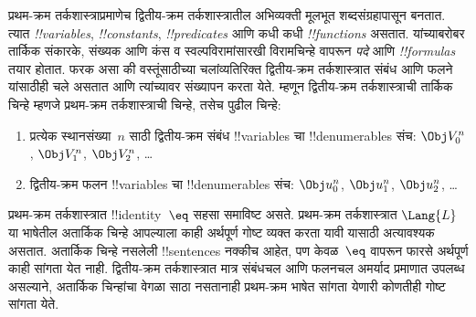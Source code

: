 \documentclass[../../../include/open-logic-section]{subfiles}
\begin{document}


प्रथम-क्रम तर्कशास्त्राप्रमाणेच द्वितीय-क्रम तर्कशास्त्रातील
अभिव्यक्ती मूलभूत शब्दसंग्रहापासून बनतात. त्यात \emph{!!{variable}s},
\emph{!!{constant}s}, \emph{!!{predicate}s} आणि कधी कधी
\emph{!!{function}s} असतात. यांच्याबरोबर तार्किक संकारके,
संख्यक आणि कंस व स्वल्पविरामांसारखी विरामचिन्हे वापरून
\emph{पदे} आणि \emph{!!{formula}s} तयार होतात. फरक असा की
वस्तूंसाठीच्या चलांव्यतिरिक्त द्वितीय-क्रम तर्कशास्त्रात संबंध
आणि फलने यांसाठीही चले असतात आणि त्यांच्यावर संख्यापन
करता येते. म्हणून द्वितीय-क्रम तर्कशास्त्राची तार्किक चिन्हे
म्हणजे प्रथम-क्रम तर्कशास्त्राची चिन्हे, तसेच पुढील चिन्हे:

\begin{enumerate}
\item प्रत्येक स्थानसंख्या~$n$ साठी द्वितीय-क्रम संबंध !!{variable}s चा
  !!{denumerable}s संच: $\Obj V_0^n$, $\Obj V_1^n$, $\Obj V_2^n$, \dots
\item द्वितीय-क्रम फलन !!{variable}s चा !!{denumerable}s संच:
  $\Obj u_0^n$, $\Obj u_1^n$, $\Obj u_2^n$, \dots
\end{enumerate}

प्रथम-क्रम तर्कशास्त्रात !!{identity}~$\eq$ सहसा समाविष्ट
असते. प्रथम-क्रम तर्कशास्त्रात $\Lang{L}$ या भाषेतील
अतार्किक चिन्हे आपल्याला काही अर्थपूर्ण गोष्ट व्यक्त करता
यावी यासाठी अत्यावश्यक असतात. अतार्किक चिन्हे नसलेली
!!{sentences} नक्कीच आहेत, पण केवळ~$\eq$ वापरून
फारसे अर्थपूर्ण काही सांगता येत नाही. द्वितीय-क्रम
तर्कशास्त्रात मात्र संबंधचल आणि फलनचल अमर्याद प्रमाणात
उपलब्ध असल्याने, अतार्किक चिन्हांचा वेगळा साठा नसतानाही
प्रथम-क्रम भाषेत सांगता येणारी कोणतीही गोष्ट सांगता येते.
\end{document}
